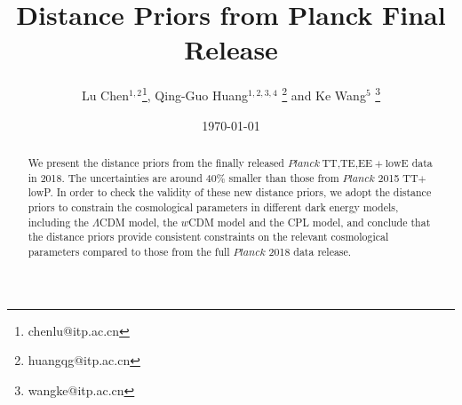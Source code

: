 \documentclass[floatfix,aps,amsmath,nofootinbib,onecolumn,10pt]{revtex4}
\begin{document}
\title{Distance Priors from Planck Final Release}

\author{ Lu Chen$^{1,2}$\footnote{chenlu@itp.ac.cn}, Qing-Guo Huang$^{1,2,3,4}$ \footnote{huangqg@itp.ac.cn} and Ke Wang$^{5}$ \footnote{wangke@itp.ac.cn}}

\date{\today}

\begin{abstract}

We present the distance priors from the finally released $Planck~ \textrm{TT,TE,EE}+\textrm{lowE}$ data in 2018. The uncertainties are around $40\%$ smaller than those from $Planck$ 2015 TT$+$lowP.  In order to check the validity of these new distance priors, we adopt the distance priors to constrain the cosmological parameters in different dark energy models, including the $\Lambda$CDM model, the $w$CDM model and the CPL model, and conclude that the distance priors provide consistent constraints on the relevant cosmological parameters compared to those from the full $Planck$ 2018 data release.
 
\end{abstract}


\maketitle

\end{document}
